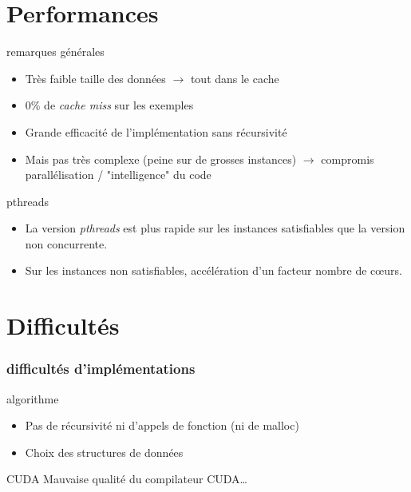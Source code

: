 \documentclass{beamer}
\newcommand{\cuda}{\textsc{CUDA}}
\begin{document}

\section{Performances}

\begin{frame}


\begin{block}{remarques générales}
\begin{itemize}
    \item Très faible taille des données $\rightarrow$ tout dans le cache
    \item 0\% de \emph{cache miss} sur les exemples
    \item Grande efficacité de l'implémentation sans récursivité
    \item Mais pas très complexe (peine sur de grosses instances) $\rightarrow$ compromis parallélisation / "intelligence" du code
\end{itemize}
\end{block}
\pause
\begin{block}{pthreads}
\begin{itemize}
    \item La version \emph{pthreads} est plus rapide sur les instances satisfiables que la version non concurrente.
    \item Sur les instances non satisfiables, accélération d'un facteur nombre de cœurs.
\end{itemize}
\end{block}

\end{frame}
   

\section{Difficultés}
    
\begin{frame}
\frametitle{difficultés d'implémentations}
\begin{block}{algorithme}
\begin{itemize}
    \item Pas de récursivité ni d'appels de fonction (ni de malloc)
    \item Choix des structures de données
\end{itemize}
\end{block}

\pause

\begin{block}{\cuda}
    Mauvaise qualité du compilateur \cuda{}\ldots{}
\end{block}

\end{frame}
\end{document}
